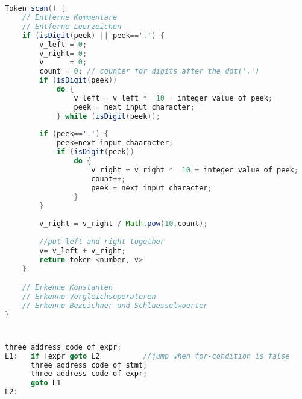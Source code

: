\documentclass[a4paper,10pt]{scrartcl}
\begin{document}
\section{}
\begin{lstlisting}[language=Java,mathescape=True]
Token scan() {
    // Entferne Kommentare
    // Entferne Leerzeichen    
    if (isDigit(peek) || peek=='.') {
        v_left = 0;
        v_right= 0;
        v	   = 0;
        count = 0; // counter for digits after the dot('.')
        if (isDigit(peek))
            do {
                v_left = v_left *  10 + integer value of peek;
                peek = next input character;
            } while (isDigit(peek));
        
        if (peek=='.') {
            peek=next input chaaracter;
            if (isDigit(peek))
                do {
                    v_right = v_right *  10 + integer value of peek;
                    count++;
                    peek = next input character;
                }
        }
        
        v_right = v_right / Math.pow(10,count);
        
        //put left and right together
        v= v_left + v_right;
        return token <number, v>
    }

    // Erkenne Konstanten
    // Erkenne Vergleichsoperatoren 
    // Erkenne Bezeichner und Schluesselwoerter
}
\end{lstlisting}
\section{}
\begin{lstlisting}[language=Java]
	  three address code of expr;
L1:   if !expr goto L2      	//jump when for-condition is false
      three address code of stmt;
	  three address code of expr;
      goto L1
L2:
\end{lstlisting}
\end{document}
